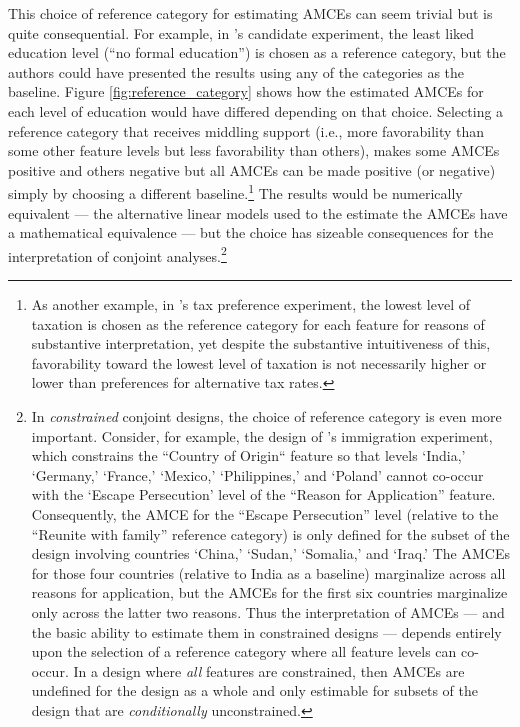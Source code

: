 \documentclass[a4paper,12pt]{article}\usepackage[]{graphicx}\usepackage[]{color}
\begin{document}
This choice of reference category for estimating AMCEs can seem trivial but is quite consequential. For example, in \citeauthor{HainmuellerHopkinsYamamoto2014}'s candidate experiment, the least liked education level (``no formal education'') is chosen as a reference category, but the authors could have presented the results using any of the categories as the baseline. Figure \ref{fig:reference_category} shows how the estimated AMCEs for each level of education would have differed depending on that choice. Selecting a reference category that receives middling support (i.e., more favorability than some other feature levels but less favorability than others), makes some AMCEs positive and others negative but all AMCEs can be made positive (or negative) simply by choosing a different baseline.\footnote{As another example, in \citeauthor{BallardRosaMartinScheve2016}'s tax preference experiment, the lowest level of taxation is chosen as the reference category for each feature for reasons of substantive interpretation, yet despite the substantive intuitiveness of this, favorability toward the lowest level of taxation is not necessarily higher or lower than preferences for alternative tax rates.} The results would be numerically equivalent --- the alternative linear models used to the estimate the AMCEs have a mathematical equivalence --- but the choice has sizeable consequences for the interpretation of conjoint analyses.\footnote{In \textit{constrained} conjoint designs, the choice of reference category is even more important. Consider, for example, the design of \citeauthor{HainmuellerHopkinsYamamoto2014}'s immigration experiment, which constrains the ``Country of Origin`` feature so that levels `India,' `Germany,' `France,' `Mexico,' `Philippines,' and `Poland' cannot co-occur with the `Escape Persecution' level of the ``Reason for Application'' feature. Consequently, the AMCE for the ``Escape Persecution'' level (relative to the  ``Reunite with family'' reference category) is only defined for the subset of the design involving countries `China,' `Sudan,' `Somalia,' and `Iraq.' The AMCEs for those four countries (relative to India as a baseline) marginalize across all reasons for application, but the AMCEs for the first six countries marginalize only across the latter two reasons. Thus the interpretation of AMCEs --- and the basic ability to estimate them in constrained designs --- depends entirely upon the selection of a reference category where all feature levels can co-occur. In a design where \textit{all} features are constrained, then AMCEs are undefined for the design as a whole and only estimable for subsets of the design that are \textit{conditionally} unconstrained.}
\end{document}
